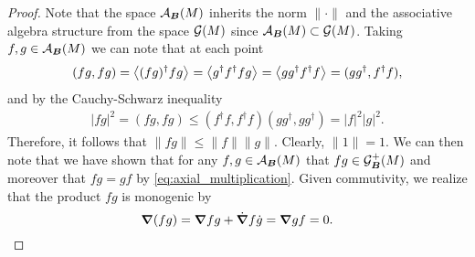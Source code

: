\begin{proof}
Note that the space $\mathcal{A}_{\boldsymbol{B}}(M)$ inherits the norm $\|\cdot \|$ and the associative algebra structure from the space $\mathcal{G}(M)$ since $\mathcal{A}_{\boldsymbol{B}}(M)\subset \mathcal{G}(M)$. Taking $f,g \in \mathcal{A}_{\boldsymbol{B}}(M)$ we can note that at each point
\begin{align}
(fg,fg) = \left\langle(fg)^\dagger fg\right\rangle_{}=\left\langle g^\dagger f^\dagger f g\right\rangle_{} = \left\langle gg^\dagger f^\dagger f\right\rangle_{} = (gg^\dagger, f^\dagger f),
\end{align}
and by the Cauchy-Schwarz inequality 
\begin{align}
|fg|^2 = (fg,fg) \leq (f^\dagger f, f^\dagger f) (gg^\dagger,gg^\dagger) = |f|^2 |g|^2.
\end{align}
Therefore, it follows that $\|fg\|\leq \|f\|\|g\|$. Clearly, $\|1\|=1$. We can then note that we have shown that for any $f,g \in \mathcal{A}_{\boldsymbol{B}}(M)$ that $fg \in \mathcal{G}_{\boldsymbol{B}}^+(M)$ and moreover that $fg=gf$ by \cref{eq:axial_multiplication}. Given commutivity, we realize that the product $fg$ is monogenic by
\begin{equation}
\boldsymbol{\nabla}(fg) = \boldsymbol{\nabla} fg+\dot{\boldsymbol{\nabla}}f \dot{g} = \boldsymbol{\nabla} g f = 0.
\end{equation}
\end{proof}


